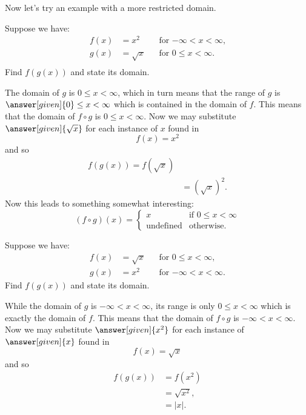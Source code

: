 \documentclass{ximera}
\begin{document}
Now let's try an example with a more restricted domain.

\begin{example}
 Suppose we have:
\begin{align*}
  f(x)&=x^2 &&\text{for $-\infty< x< \infty$,}\\
  g(x)&= \sqrt{x} &&\text{for $0\le x< \infty$.}\\
\end{align*}
Find $f(g(x))$ and state its domain.
\begin{explanation}
  The domain of $g$ is $0\le x< \infty$, which in turn means that the
  range of $g$ is $\answer[given]{0}\le x< \infty$ which is contained
  in the domain of $f$. This means that the domain of $f\circ g$ is
  $0\le x< \infty$.  Now we may substitute $\answer[given]{\sqrt{x}}$ for each
  instance of $x$ found in
  \[
  f(x)={{x}^{2}}
  \]
  and so
  \begin{align*}
  f(g(x))=f(\sqrt{x})\\
  &=\left(\sqrt{x}\right)^2.
  \end{align*}
  Now this leads to something somewhat interesting:
  \[
  (f\circ g)(x) = 
  \begin{cases}
    x & \text{if $0\le x < \infty$}\\
   \text{undefined} &\text{otherwise}. 
  \end{cases}
  \]
\end{explanation}
\end{example}


\begin{example}
 Suppose we have:
\begin{align*}
  f(x)&=\sqrt{x} &&\text{for $0\le x< \infty$,}\\
  g(x)&= x^2 &&\text{for $-\infty< x< \infty$.}
\end{align*}
Find $f(g(x))$ and state its domain.
\begin{explanation}
  While the domain of $g$ is $-\infty< x< \infty$, its range is only
  $0 \le x<\infty$ which is exactly the domain of $f$. This means that
  the domain of $f\circ g$ is $-\infty< x< \infty$.  Now we may
  substitute $\answer[given]{x^2}$ for each instance of $\answer[given]{x}$ found in
  \[
  f(x)=\sqrt{x}
  \]
  and so
  \begin{align*}
  f(g(x))&=f(x^2)\\
  &=\sqrt{x^2},\\
  &=|x|.
  \end{align*}
\end{explanation}
\end{example}
\end{document}
